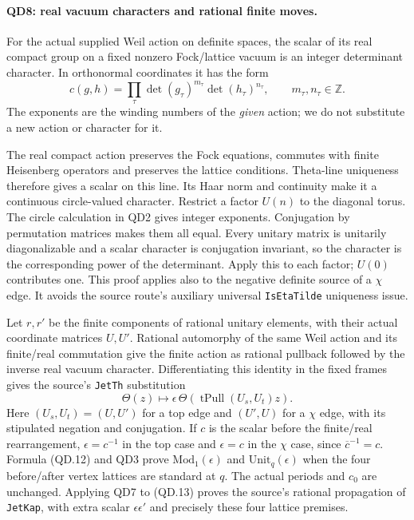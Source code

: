 \paragraph{QD8: real vacuum characters and rational finite moves.}
For the actual supplied Weil action on definite spaces, the
scalar of its real compact group on a fixed nonzero Fock/lattice
vacuum is an integer determinant character.  In orthonormal
coordinates it has the form
\[
 c(g,h)=\prod_\tau\det(g_\tau)^{m_\tau}
                         \det(h_\tau)^{n_\tau},
                         \qquad m_\tau,n_\tau\in\mathbb Z. \tag{QD.12}
\]
The exponents are the winding numbers of the \emph{given}
action; we do not substitute a new action or character for it.

The real compact action preserves the Fock equations, commutes
with finite Heisenberg operators and preserves the lattice
conditions.  Theta-line uniqueness therefore gives a scalar on
this line.  Its Haar norm and continuity make it a continuous
circle-valued character.  Restrict a factor $U(n)$ to the diagonal
torus.  The circle calculation in QD2 gives integer exponents.
Conjugation by permutation matrices makes them all equal.
Every unitary matrix is unitarily diagonalizable and a scalar
character is conjugation invariant, so the character is the
corresponding power of the determinant.  Apply this to each
factor; $U(0)$ contributes one.  This proof applies also to the
negative definite source of a $\chi$ edge.  It avoids the source
route's auxiliary universal \texttt{IsEtaTilde} uniqueness issue.

Let $r,r'$ be the finite components of rational unitary elements,
with their actual coordinate matrices $U,U'$.  Rational automorphy
of the same Weil action and its finite/real commutation give the
finite action as rational pullback followed by the inverse real
vacuum character.  Differentiating this identity in the fixed
frames gives the source's \texttt{JetTh} substitution
\[
 \Theta(z)\longmapsto
       \epsilon\,\Theta(\operatorname{tPull}(U_s,U_t)z).
                                                               \tag{QD.13}
\]
Here $(U_s,U_t)=(U,U')$ for a top edge and $(U',U)$ for a
$\chi$ edge, with its stipulated negation and conjugation.
If $c$ is the scalar before the finite/real rearrangement,
$\epsilon=c^{-1}$ in the top case and $\epsilon=c$ in the
$\chi$ case, since $\overline c^{-1}=c$.  Formula (QD.12) and
QD3 prove $\mathrm{Mod}_1(\epsilon)$ and
$\mathrm{Unit}_q(\epsilon)$ when the four before/after vertex
lattices are standard at $q$.  The actual periods and $c_0$
are unchanged.  Applying QD7 to (QD.13) proves the source's
rational propagation of \texttt{JetKap}, with extra scalar
$\epsilon\epsilon'$ and precisely these four lattice premises.

